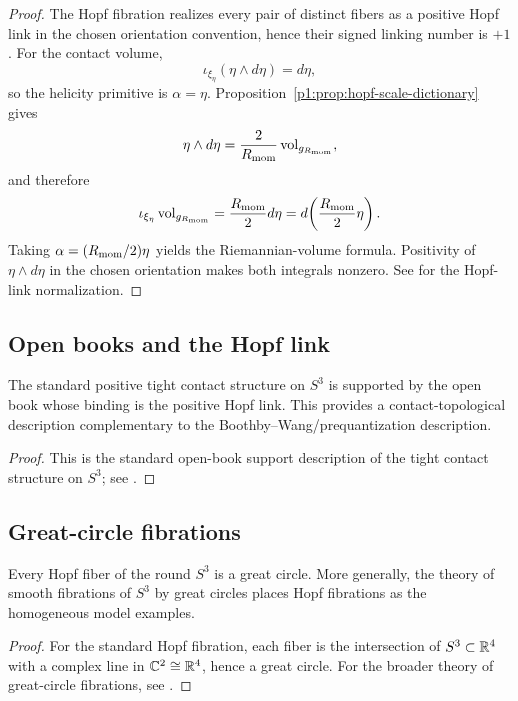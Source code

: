 \documentclass[11pt]{article}
\begin{document}
\begin{proof}
The Hopf fibration realizes every pair of distinct fibers as a positive Hopf
link in the chosen orientation convention, hence their signed linking number
is \(+1\).  For the contact volume,
\[
    \iota_{\xi_\eta}(\eta\wedge d\eta)=d\eta,
\]
so the helicity primitive is \(\alpha=\eta\).  Proposition~\ref{p1:prop:hopf-scale-dictionary}
gives
\[
    \eta\wedge d\eta=\frac{2}{R_{\mathrm{mom}}}\operatorname{vol}_{g_{R_{\mathrm{mom}}}},
\]
and therefore
\[
    \iota_{\xi_\eta}\operatorname{vol}_{g_{R_{\mathrm{mom}}}}
    =\frac{R_{\mathrm{mom}}}{2}d\eta
    =d\!\left(\frac{R_{\mathrm{mom}}}{2}\eta\right).
\]
Taking \(\alpha=(R_{\mathrm{mom}}/2)\eta\) yields the Riemannian-volume formula.  Positivity
of \(\eta\wedge d\eta\) in the chosen orientation makes both integrals nonzero.
See \cite{rolfsen1976knots} for the Hopf-link normalization.
\end{proof}

\subsection{Open books and the Hopf link}
\label{p1:der:open-book-hopf}

\begin{theorem}
\label{p1:thm:positive-hopf-link-open-book}
The standard positive tight contact structure on \(S^3\) is supported by the open
book whose binding is the positive Hopf link. This provides a contact-topological
description complementary to the Boothby--Wang/prequantization description.
\end{theorem}

\begin{proof}
This is the standard open-book support description of the tight contact structure on \(S^3\); see \cite{Etnyre2004openbook}.
\end{proof}


\subsection{Great-circle fibrations}
\label{p1:der:great-circle}

\begin{theorem}
\label{p1:thm:hopf-fibers-great-circles}
Every Hopf fiber of the round \(S^3\) is a great circle. More generally, the theory
of smooth fibrations of \(S^3\) by great circles places Hopf fibrations as the
homogeneous model examples.
\end{theorem}

\begin{proof}
For the standard Hopf fibration, each fiber is the intersection of \(S^3\subset\mathbb{R}^4\)
with a complex line in \(\mathbb{C}^2\cong\mathbb{R}^4\), hence a great circle. For the broader
theory of great-circle fibrations, see \cite{GluckWarner1983}.
\end{proof}
\end{document}
